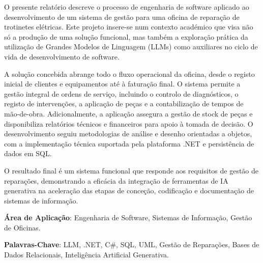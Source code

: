 \documentclass[a4paper,12pt]{scrreprt}
\begin{document}

\makecover






\renewenvironment{abstract}
 {\par\noindent\textbf{\Large\abstractname}\par\bigskip}
 {}

\begin{flushleft}
\begin{abstract}
    O presente relatório descreve o processo de engenharia de software aplicado ao desenvolvimento de um sistema de gestão para uma oficina de reparação de trotinetes elétricas. Este projeto insere-se num contexto académico que visa não só a produção de uma solução funcional, mas também a exploração prática da utilização de Grandes Modelos de Linguagem (LLMs) como auxiliares no ciclo de vida de desenvolvimento de software.
    
    A solução concebida abrange todo o fluxo operacional da oficina, desde o registo inicial de clientes e equipamentos até à faturação final. O sistema permite a gestão integral de ordens de serviço, incluindo o controlo de diagnósticos, o registo de intervenções, a aplicação de peças e a contabilização de tempos de mão-de-obra. Adicionalmente, a aplicação assegura a gestão de stock de peças e disponibiliza relatórios técnicos e financeiros para apoio à tomada de decisão. O desenvolvimento seguiu metodologias de análise e desenho orientadas a objetos, com a implementação técnica suportada pela plataforma .NET e persistência de dados em SQL.
    
    O resultado final é um sistema funcional que responde aos requisitos de gestão de reparações, demonstrando a eficácia da integração de ferramentas de IA generativa na aceleração das etapas de conceção, codificação e documentação de sistemas de informação.

    \par \textbf{Área de Aplicação}: Engenharia de Software, Sistemas de Informação, Gestão de Oficinas.
    \par \textbf{Palavras-Chave}: LLM, .NET, C\#, SQL, UML, Gestão de Reparações, Bases de Dados Relacionais, Inteligência Artificial Generativa.
\end{abstract}
\end{flushleft}
\end{document}
